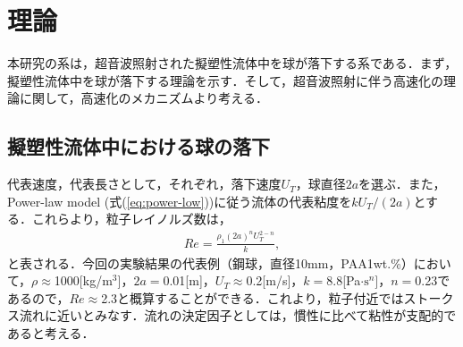 \section{理論}

本研究の系は，超音波照射された擬塑性流体中を球が落下する系である．まず，擬塑性流体中を球が落下する理論を示す．そして，超音波照射に伴う高速化の理論に関して，高速化のメカニズムより考える．

\subsection{擬塑性流体中における球の落下}
代表速度，代表長さとして，それぞれ，落下速度$U_T$，球直径$2a$を選ぶ．また，Power-law model (式(\ref{eq:power-low}))に従う流体の代表粘度を$k U_T/(2a)$とする．これらより，粒子レイノルズ数は，
\begin{eqnarray}
    Re = \frac{\rho_1 \left(2a\right)^n U_T^{2-n}}{k} ,
\end{eqnarray}
と表される\cite{ref:1,ref:8-5}．今回の実験結果の代表例（鋼球，直径10mm，PAA1wt.\%）において，$\rho \approx$1000[kg/m${}^3$]，$2a =$0.01[m]，$U_T \approx$0.2[m/s]，$k =$8.8[Pa$\cdot \text{s}^n]$，$n =$0.23であるので，$Re \approx$2.3と概算することができる．これより，粒子付近ではストークス流れに近いとみなす．流れの決定因子としては，慣性に比べて粘性が支配的であると考える．

